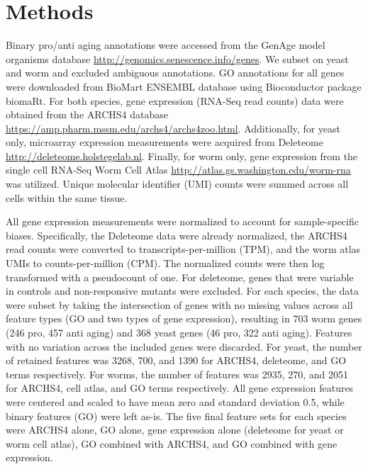\documentclass{article}
\begin{document}
\section{Methods}

Binary pro/anti aging annotations were accessed from the GenAge model organisms database \url{http://genomics.senescence.info/genes}. We subset on yeast and worm and excluded ambiguous annotations. GO annotations for all genes were downloaded from BioMart ENSEMBL database using Bioconductor package biomaRt. For both species, gene expression (RNA-Seq read counts) data were obtained from the ARCHS4 database \url{https://amp.pharm.mssm.edu/archs4/archs4zoo.html}. Additionally, for yeast only, microarray expression measurements were acquired from Deleteome \url{http://deleteome.holstegelab.nl}. Finally, for worm only, gene expression from the single cell RNA-Seq Worm Cell Atlas \url{http://atlas.gs.washington.edu/worm-rna} was utilized. Unique molecular identifier (UMI) counts were summed across all cells within the same tissue.

All gene expression measurements were normalized to account for sample-specific biases. Specifically, the Deleteome data were already normalized, the ARCHS4 read counts were converted to transcripts-per-million (TPM), and the worm atlas UMIs to counts-per-million (CPM). The normalized counts were then log transformed with a pseudocount of one. For deleteome, genes that were variable in controls and non-responsive mutants were excluded. For each species, the data were subset by taking the intersection of genes with no missing values across all feature types (GO and two types of gene expression), resulting in 703 worm genes (246 pro, 457 anti aging) and 368 yeast genes (46 pro, 322 anti aging). Features with no variation across the included genes were discarded. For yeast, the number of retained features was 3268, 700, and 1390 for ARCHS4, deleteome, and GO terms respectively. For worms, the number of features was 2935, 270, and 2051 for ARCHS4, cell atlas, and GO terms respectively. All gene expression features were centered and scaled to have mean zero and standard deviation 0.5, while binary features (GO) were left as-is. The five final feature sets for each species were ARCHS4 alone, GO alone, gene expression alone (deleteome for yeast or worm cell atlas), GO combined with ARCHS4, and GO combined with gene expression.
\end{document}
